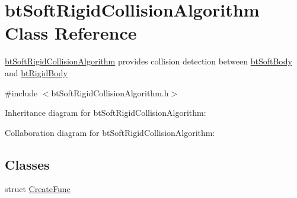 \hypertarget{classbt_soft_rigid_collision_algorithm}{\section{bt\+Soft\+Rigid\+Collision\+Algorithm Class Reference}
\label{classbt_soft_rigid_collision_algorithm}
}


\hyperlink{classbt_soft_rigid_collision_algorithm}{bt\+Soft\+Rigid\+Collision\+Algorithm} provides collision detection between \hyperlink{classbt_soft_body}{bt\+Soft\+Body} and \hyperlink{classbt_rigid_body}{bt\+Rigid\+Body}  




{\ttfamily \#include $<$bt\+Soft\+Rigid\+Collision\+Algorithm.\+h$>$}



Inheritance diagram for bt\+Soft\+Rigid\+Collision\+Algorithm\+:


Collaboration diagram for bt\+Soft\+Rigid\+Collision\+Algorithm\+:
\subsection*{Classes}
\begin{DoxyCompactItemize}
\item 
struct \hyperlink{structbt_soft_rigid_collision_algorithm_1_1_create_func}{Create\+Func}
\end{DoxyCompactItemize}

